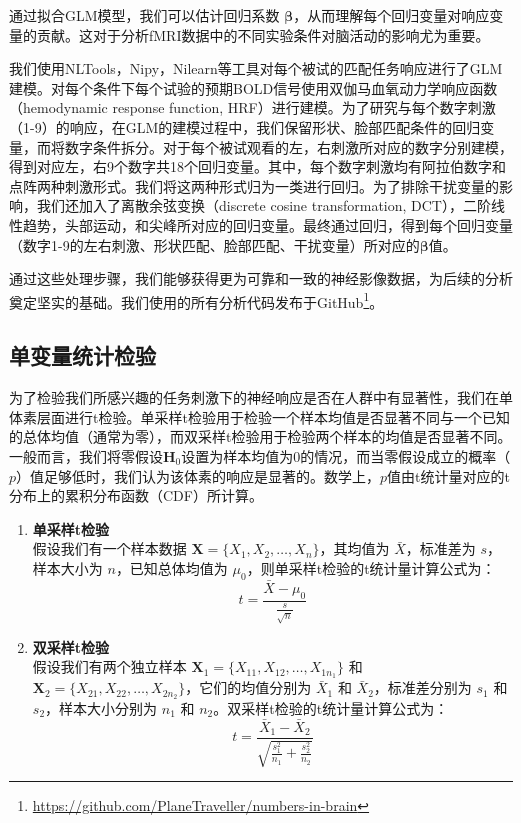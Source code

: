 \documentclass[bachelor, comfort]{shtthesis}
\begin{document}
通过拟合GLM模型，我们可以估计回归系数 \(\boldsymbol{\beta}\)，从而理解每个回归变量对响应变量的贡献。这对于分析fMRI数据中的不同实验条件对脑活动的影响尤为重要。

我们使用NLTools\cite{nltools}，Nipy\cite{nipy}，Nilearn\cite{nilearn}等工具对每个被试的匹配任务响应进行了GLM建模。对每个条件下每个试验的预期BOLD信号使用双伽马血氧动力学响应函数（hemodynamic response function, HRF）进行建模。为了研究与每个数字刺激（1-9）的响应，在GLM的建模过程中，我们保留形状、脸部匹配条件的回归变量，而将数字条件拆分。对于每个被试观看的左，右刺激所对应的数字分别建模，得到对应左，右9个数字共18个回归变量。其中，每个数字刺激均有阿拉伯数字和点阵两种刺激形式。我们将这两种形式归为一类进行回归。为了排除干扰变量的影响，我们还加入了离散余弦变换（discrete cosine transformation, DCT），二阶线性趋势，头部运动，和尖峰所对应的回归变量。最终通过回归，得到每个回归变量（数字1-9的左右刺激、形状匹配、脸部匹配、干扰变量）所对应的\(\boldsymbol{\beta}\)值。



通过这些处理步骤，我们能够获得更为可靠和一致的神经影像数据，为后续的分析奠定坚实的基础。我们使用的所有分析代码发布于GitHub\footnote{\url{https://github.com/PlaneTraveller/numbers-in-brain}}。

\subsection{单变量统计检验}
为了检验我们所感兴趣的任务刺激下的神经响应是否在人群中有显著性，我们在单体素层面进行t检验。单采样t检验用于检验一个样本均值是否显著不同与一个已知的总体均值（通常为零），而双采样t检验用于检验两个样本的均值是否显著不同。一般而言，我们将零假设$\mathbf{H}_{0}$设置为样本均值为0的情况，而当零假设成立的概率（$p$）值足够低时，我们认为该体素的响应是显著的。数学上，$p$值由t统计量对应的t分布上的累积分布函数（CDF）所计算。

\begin{enumerate}
	\item \textbf{单采样t检验}\\
	      假设我们有一个样本数据 \(\mathbf{X} = \{X_1, X_2, \ldots, X_n\}\)，其均值为 \(\bar{X}\)，标准差为 \(s\)，样本大小为 \(n\)，已知总体均值为 \(\mu_0\)，则单采样t检验的t统计量计算公式为：
	      \[
		      t = \frac{\bar{X} - \mu_0}{\frac{s}{\sqrt{n}}}
	      \]

	\item \textbf{双采样t检验}\\
	      假设我们有两个独立样本 \(\mathbf{X}_1 = \{X_{11}, X_{12}, \ldots, X_{1n_1}\}\) 和 \(\mathbf{X}_2 = \{X_{21}, X_{22}, \ldots, X_{2n_2}\}\)，它们的均值分别为 \(\bar{X}_1\) 和 \(\bar{X}_2\)，标准差分别为 \(s_1\) 和 \(s_2\)，样本大小分别为 \(n_1\) 和 \(n_2\)。双采样t检验的t统计量计算公式为：
	      \[
		      t = \frac{\bar{X}_1 - \bar{X}_2}{\sqrt{\frac{s_1^2}{n_1} + \frac{s_2^2}{n_2}}}
	      \]
\end{enumerate}
\end{document}
